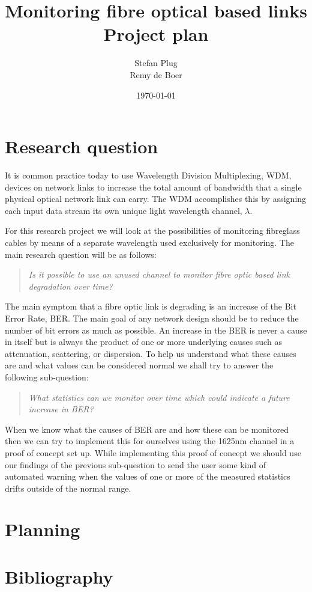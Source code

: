 \documentclass{article}
\begin{document}
\title{Monitoring fibre optical based links\\Project plan}
\author{Stefan Plug\\Remy de Boer}
\date{\today}
\maketitle

\section{Research question}
It is common practice today to use Wavelength Division Multiplexing, WDM, devices on network links to increase the total amount of bandwidth that a single physical optical network link can carry. The WDM accomplishes this by assigning each input data stream its own unique light wavelength channel, $\lambda$. 

For this research project we will look at the possibilities of monitoring fibreglass cables by means of a separate wavelength used exclusively for monitoring. 
The main research question will be as follows:
\begin{quote}
\textit{
Is it possible to use an unused channel to monitor fibre optic based link degradation over time?
}
\end{quote}

The main symptom that a fibre optic link is degrading is an increase of the Bit Error Rate, BER.
The main goal of any network design should be to reduce the number of bit errors as much as possible.
An increase in the BER is never a cause in itself but is always the product of one or more underlying causes such as attenuation, scattering, or dispersion. To help us understand what these causes are and what values can be considered normal we shall try to answer the following sub-question:
\begin{quote}
\textit{
What statistics can we monitor over time which could indicate a future increase in BER?
}
\end{quote}
When we know what the causes of BER are and how these can be monitored then we can try to implement this for ourselves using the 1625nm channel in a proof of concept set up. 
While implementing this proof of concept we should use our findings of the previous sub-question to send the user some kind of automated warning when the values of one or more of the measured statistics drifts outside of the normal range.

\section{Planning}

\section{Bibliography}


\end{document}
